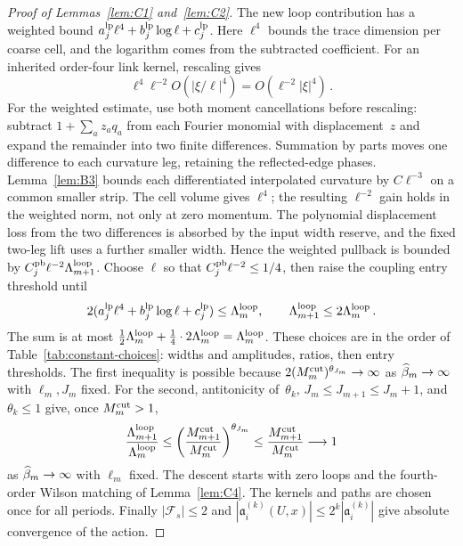 \begin{proof}[Proof of Lemmas~\ref{lem:C1} and~\ref{lem:C2}]
The new loop contribution has a weighted bound $a_j^{\rm lp}\ell^4+b_j^{\rm lp}\log\ell+c_j^{\rm lp}$. Here $\ell^4$ bounds the trace dimension per coarse cell, and the logarithm comes from the subtracted coefficient. For an inherited order-four link kernel, rescaling gives
\begin{equation*}
\ell^4\ell^{-2}O(|\xi/\ell|^4)=O(\ell^{-2}|\xi|^4)\,.
\end{equation*}
For the weighted estimate, use both moment cancellations before rescaling: subtract $1+\sum_a z_aq_a$ from each Fourier monomial with displacement~$z$ and expand the remainder into two finite differences. Summation by parts moves one difference to each curvature leg, retaining the reflected-edge phases. Lemma~\ref{lem:B3} bounds each differentiated interpolated curvature by $C\ell^{-3}$ on a common smaller strip. The cell volume gives $\ell^4$; the resulting $\ell^{-2}$ gain holds in the weighted norm, not only at zero momentum. The polynomial displacement loss from the two differences is absorbed by the input width reserve, and the fixed two-leg lift uses a further smaller width. Hence the weighted pullback is bounded by $C_j^{\rm pb}\ell^{-2}\Lambda_{m+1}^{\rm loop}$. Choose $\ell$ so that $C_j^{\rm pb}\ell^{-2}\le1/4$, then raise the coupling entry threshold until
\begin{equation*}
2(a_j^{\rm lp}\ell^4+b_j^{\rm lp}\log\ell+c_j^{\rm lp})\le\Lambda_m^{\rm loop},\qquad
\Lambda_{m+1}^{\rm loop}\le2\Lambda_m^{\rm loop}\,.
\end{equation*}
The sum is at most $\tfrac12\Lambda_m^{\rm loop}+\tfrac14\cdot2\Lambda_m^{\rm loop}=\Lambda_m^{\rm loop}$. These choices are in the order of Table~\ref{tab:constant-choices}: widths and amplitudes, ratios, then entry thresholds. The first inequality is possible because $2(M^{\mathrm{cut}}_m)^{\theta_{J_m}}\to\infty$ as $\widehat{\beta}_m\to\infty$ with $\ell_m,J_m$ fixed. For the second, antitonicity of~$\theta_k$, $J_m\le J_{m+1}\le J_m+1$, and $\theta_k\le1$ give, once $M^{\mathrm{cut}}_m>1$,
\begin{equation*}
\frac{\Lambda_{m+1}^{\rm loop}}{\Lambda_m^{\rm loop}}
\le\left(\frac{M^{\mathrm{cut}}_{m+1}}{M^{\mathrm{cut}}_m}\right)^{\theta_{J_m}}
\le\frac{M^{\mathrm{cut}}_{m+1}}{M^{\mathrm{cut}}_m}\longrightarrow1
\end{equation*}
as $\widehat{\beta}_m\to\infty$ with $\ell_m$ fixed. The descent starts with zero loops and the fourth-order Wilson matching of Lemma~\ref{lem:C4}. The kernels and paths are chosen once for all periods. Finally $|\mathcal F_s|\le2$ and $|\mathfrak a_i^{(k)}(U,x)|\le2^k|\mathfrak a_i^{(k)}|$ give absolute convergence of the action.
\end{proof}
